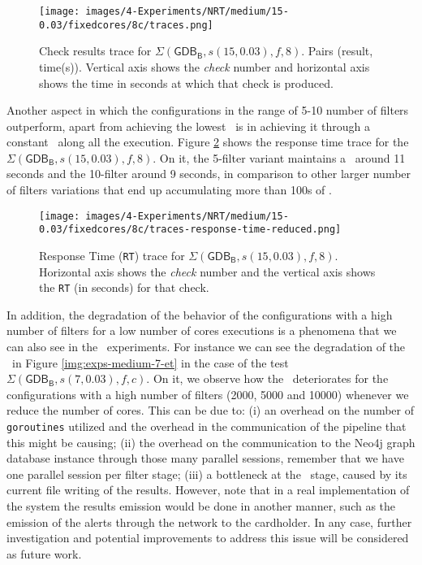\begin{figure}[H]
    \centering
    \texttt{[image: images/4-Experiments/NRT/medium/15-0.03/fixedcores/8c/traces.png]}
    \caption{Check results trace for $\Sigma(\mathsf{GDB_B}, s(15, 0.03), f, 8)$. Pairs (result, time(s)). Vertical axis shows the \emph{check} number and horizontal axis shows the time in seconds at which that check is produced.}
    \label{img:exps-medium-15D-8c-trace}
\end{figure}

Another aspect in which the configurations in the range of 5-10 number of filters outperform, apart from achieving the lowest \MRT\ is in achieving it through a constant \RT\ along all the execution. Figure \ref{img:exps-medium-15-rtraces-reduced} shows the response time trace for the $\Sigma(\mathsf{GDB_B}, s(15, 0.03), f, 8)$. On it, the 5-filter variant maintains a \RT\  around 11 seconds and the 10-filter around 9 seconds, in comparison to other larger number of filters variations that end up accumulating more than 100s of \RT.\\

\begin{figure}[H]
    \centering
    \texttt{[image: images/4-Experiments/NRT/medium/15-0.03/fixedcores/8c/traces-response-time-reduced.png]}
    \caption{Response Time (\texttt{RT}) trace for $\Sigma(\mathsf{GDB_B}, s(15, 0.03), f, 8)$. Horizontal axis shows the \emph{check} number and the vertical axis shows the \texttt{RT} (in seconds) for that check.}
    \label{img:exps-medium-15-rtraces-reduced}
\end{figure}

In addition, the degradation of the behavior of the configurations with a high number of filters for a low number of cores executions is a phenomena that we can also see in the \mediumG\ experiments. For instance we can see the degradation of the \ET\ in Figure \ref{img:exps-medium-7-et} in the case of the test $\Sigma(\mathsf{GDB_B}, s(7, 0.03), f, c)$. On it, we observe how the \ET\ deteriorates for the configurations with a high number of filters (2000, 5000 and 10000) whenever we reduce the number of cores. This can be due to: (i) an overhead on the number of \texttt{goroutines} utilized and the overhead in the communication of the pipeline that this might be causing; (ii) the overhead on the communication to the Neo4j graph database instance through those many parallel sessions, remember that we have one parallel session per filter stage; (iii) a bottleneck at the \sink \Sk\ stage, caused by its current file writing of the results. However, note that in a real implementation of the system the results emission would be done in another manner, such as the emission of the alerts through the network to the cardholder. In any case, further investigation and potential improvements to address this issue will be considered as future work.


